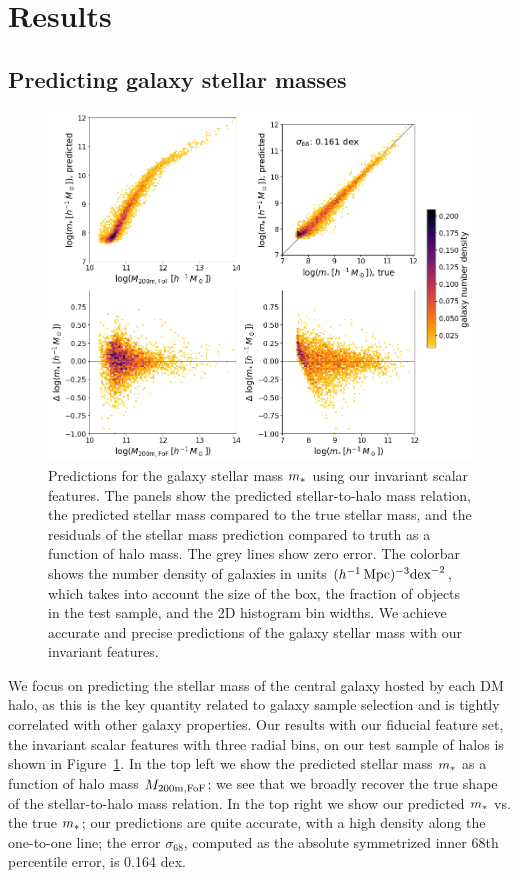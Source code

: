\section{Results}
\label{sec:results}

\subsection{Predicting galaxy stellar masses}
\label{sec:pred_mstellar}

\begin{figure}
    \centering
    \includegraphics[width=0.7\columnwidth]{pred_mstellar.png}
    \caption{Predictions for the galaxy stellar mass $m_*$ using our invariant scalar features. The panels show the predicted stellar-to-halo mass relation, the predicted stellar mass compared to the true stellar mass, and the residuals of the stellar mass prediction compared to truth as a function of halo mass. The grey lines show zero error. The colorbar shows the number density of galaxies in units $(h^{-1}\,\mathrm{Mpc})^{-3} \text{dex}^{-2}$, which takes into account the size of the box, the fraction of objects in the test sample, and the 2D histogram bin widths. We achieve accurate and precise predictions of the galaxy stellar mass with our invariant features.}
    \label{fig:mstellar}
\end{figure}

We focus on predicting the stellar mass of the central galaxy hosted by each DM halo, as this is the key quantity related to galaxy sample selection and is tightly correlated with other galaxy properties.
Our results with our fiducial feature set, the invariant scalar features with three radial bins, on our test sample of halos is shown in Figure~\ref{fig:mstellar}. 
In the top left we show the predicted stellar mass $m_*$ as a function of halo mass $M_\mathrm{200m,FoF}$; we see that we broadly recover the true shape of the stellar-to-halo mass relation. 
In the top right we show our predicted $m_*$ vs. the true $m_*$; our predictions are quite accurate, with a high density along the one-to-one line; the error $\sigma_{68}$, computed as the absolute symmetrized inner 68th percentile error, is 0.164 dex.

